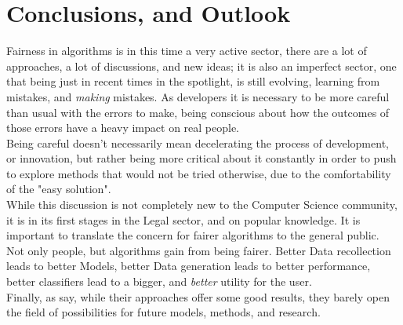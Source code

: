 \section{Conclusions, and Outlook}
Fairness in algorithms is in this time a very active sector, there are a lot of approaches, a lot of discussions, and new ideas; it is also an imperfect sector, one that being just in recent times in the spotlight, is still evolving, learning from mistakes, and \textsl{making} mistakes. As developers it is necessary to be more careful than usual with the errors to make, being conscious about how the outcomes of those errors have a heavy impact on real people.\\
Being careful doesn't necessarily mean decelerating the process of development, or innovation, but rather being more critical about it constantly in order to push to explore methods that would not be tried otherwise, due to the comfortability of the "easy solution".\\
While this discussion is not completely new to the Computer Science community, it is in its first stages in the Legal sector, and on popular knowledge. It is important to translate the concern for fairer algorithms to the general public. \\
Not only people, but algorithms gain from being fairer. Better Data recollection leads to better Models, better Data generation leads to better performance, better classifiers lead to a bigger, and \textsl{better} utility for the user.\\
Finally, as \cite{MSHJ20}\cite{FairClassifier} say, while their approaches offer some good results, they barely open the field of possibilities for future models, methods, and research.
